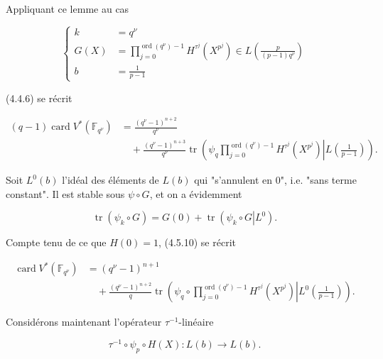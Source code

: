 Appliquant ce lemme au cas

\[
\left\{
\begin{aligned}
k&=q^\nu\\
G(X)&=\prod_{j=0}^{\operatorname{ord}(q^\nu)-1}
H^{\tau^j}(X^{p^j})
\in L\!\left(\frac{p}{(p-1)q^\nu}\right)\\
b&=\frac1{p-1}
\end{aligned}
\right.
\]

(4.4.6) se récrit

\begin{equation}\tag{4.5.10}
\begin{aligned}
(q-1)\operatorname{card}V^*(\mathbb F_{q^\nu})
&=\frac{(q^\nu-1)^{n+2}}{q^\nu}\\
&\quad+\frac{(q^\nu-1)^{n+3}}{q^\nu}
\operatorname{tr}\!\left(
\left.\psi_q
\prod_{j=0}^{\operatorname{ord}(q^\nu)-1}H^{\tau^j}(X^{p^j})
\right|L\!\left(\frac1{p-1}\right)\right).
\end{aligned}
\end{equation}

Soit $L^0(b)$ l'idéal des éléments de $L(b)$ qui "s'annulent en $0$",
i.e. "sans terme constant". Il est stable sous $\psi\circ G$, et on a
évidemment

\begin{equation}\tag{4.5.11}
\operatorname{tr}(\psi_k\circ G)
=G(0)+\operatorname{tr}\!\left(
\left.\psi_k\circ G\right|L^0\right).
\end{equation}

Compte tenu de ce que $H(0)=1$, (4.5.10) se récrit

\begin{equation}\tag{4.5.12}
\begin{aligned}
\operatorname{card}V^*(\mathbb F_{q^\nu})
&=(q^\nu-1)^{n+1}\\
&\quad+\frac{(q^\nu-1)^{n+2}}{q}
\operatorname{tr}\!\left(
\left.\psi_q\circ
\prod_{j=0}^{\operatorname{ord}(q^\nu)-1}H^{\tau^j}(X^{p^j})
\right|L^0\!\left(\frac1{p-1}\right)\right).
\end{aligned}
\end{equation}


Considérons maintenant l'opérateur $\tau^{-1}$-linéaire

\begin{equation}\tag{4.5.13}
\tau^{-1}\circ\psi_p\circ H(X):L(b)\longrightarrow L(b).
\end{equation}

